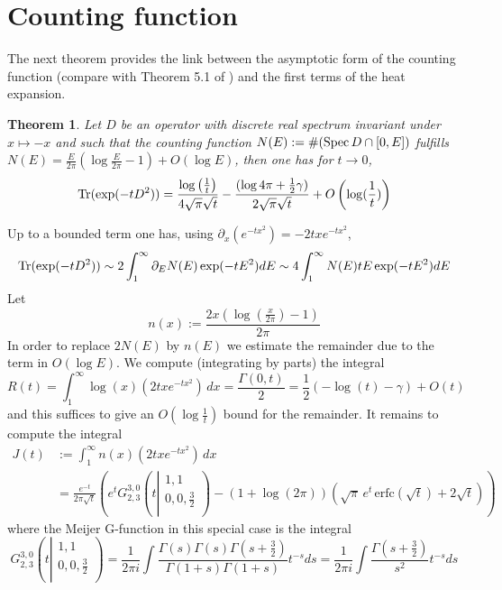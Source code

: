 \documentclass[reqno,12pt]{amsart}
\newtheorem{thm}{Theorem}[section]
\def\Sp{{\rm Spec}\,}
\def\Tr{{\rm Tr}}
\def\Tr{{\rm Tr}}
\begin{document}
\section{Counting function}\label{counting}
The 
 next theorem provides the  link between the asymptotic form of the counting function (compare with Theorem 5.1 of \cite{CM}) and  the first terms of the heat expansion.  \begin{thm}\label{estimgen} Let $D$ be an operator with discrete real spectrum invariant under $x\mapsto -x$ and such that the counting function $N(E):=\#(\Sp D\cap [0,E])$
  	fulfills $N(E)=\frac {E}{2\pi}\left(\log \frac {E}{2\pi}-1 \right)+O(\log E)$, then one has for $t\to 0$,
  	\begin{equation}\label{asymp1}
	\Tr(\exp(-tD^2))= \frac{\log \left(\frac{1}{ t}\right) }{4 \sqrt{\pi } \sqrt{t}}-\frac{(\log 4\pi +\frac 12\gamma)}{2\sqrt{ \pi } \sqrt{t}}+O\left(\log (\frac{1}{ t})\right)\end{equation}
	  \end{thm}
  \proof Up to a bounded term one has, using $\partial_x(e^{-tx^2})=-2 t x e^{-t x^2}$, 
  $$
  \Tr(\exp(-tD^2))\sim 2\int_1^{\infty }\partial_EN(E)\exp(-tE^2)dE\sim 4\int_1^{\infty }N(E)tE\exp(-tE^2)dE
  $$
  Let 
  $$
 n(x):=\frac{2 x \left(\log \left(\frac{x}{2 \pi }\right)-1\right)}{2 \pi }
  $$
  In order to replace $2N(E)$ by $n(E)$ we 
 estimate the remainder due to the term in $O(\log E)$. We compute (integrating by parts) the integral
  $$
  R(t)=\int_1^{\infty } \log(x) \left(2 t x e^{-t x^2}\right) \, dx=\frac{\Gamma (0,t)}{2}=\frac{1}{2} (-\log (t)-\gamma )+O(t)
  $$
  and this suffices to give an $O(\log \frac1t)$ bound for the remainder.\newline
 It remains to compute the integral 
  \begin{align*}
    J(t)&:=\int_1^{\infty } n(x) \left(2 t x e^{-t x^2}\right) \, dx \\
    &=\frac{e^{-t}}{2 \pi  \sqrt{t}} \left(e^t G_{2,3}^{3,0}\left(t\left|
\begin{array}{c}
 1,1 \\
 0,0,\frac{3}{2} \\
\end{array}
\right.\right)-(1+\log (2 \pi )) \left(\sqrt{\pi }\, e^t\, \text{erfc}\left(\sqrt{t}\right)+2 \sqrt{t}\right)\right)
  \end{align*}
  where the Meijer G-function in this special case is the integral
  $$
  G_{2,3}^{3,0}\left(t\left|
\begin{array}{c}
 1,1 \\
 0,0,\frac{3}{2} \\
\end{array}
\right.\right)=\frac{1}{2\pi i}\int \frac{\Gamma(s)\Gamma(s)\Gamma(s+\frac 32)}{\Gamma(1+s)\Gamma(1+s)}t^{-s}ds=\frac{1}{2\pi i}\int \frac{\Gamma(s+\frac 32)}{s^2}t^{-s}ds
  $$
\end{document}
